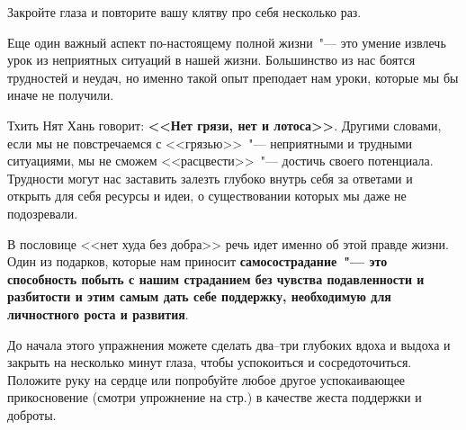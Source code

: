 \begin{center}
	{\large Закройте глаза и повторите вашу клятву про себя несколько раз.}
\end{center}

\vspace{3ex}


\newpage
{} \label{Ex:Silver_Linings}

Еще один важный аспект по-настоящему полной жизни~"--- это умение извлечь урок из неприятных ситуаций в нашей жизни. Большинство из нас боятся трудностей и неудач, но именно такой опыт преподает нам уроки, которые мы бы иначе не получили.

Тхить Нят Хань говорит: \textbf{<<Нет грязи, нет и лотоса>>}. Другими словами, если мы не повстречаемся с <<грязью>>~"--- неприятными и трудными ситуациями, мы не сможем <<расцвести>>~"--- достичь своего потенциала. Трудности могут нас заставить залезть глубоко внутрь себя за ответами и открыть для себя ресурсы и идеи, о существовании которых мы даже не подозревали. 

В пословице <<нет худа без добра>> речь идет именно об этой правде жизни. Один из подарков, которые нам приносит \textbf{самосострадание~"--- это способность побыть с нашим страданием без чувства подавленности и разбитости и этим самым дать себе поддержку, необходимую для личностного роста и развития}. 

До начала этого упражнения можете сделать два--три глубоких вдоха и выдоха и закрыть на несколько минут глаза, чтобы успокоиться и сосредоточиться. Положите руку на сердце или попробуйте любое другое успокаивающее прикосновение (смотри упрожнение на стр.\:\pageref{IP:Soothing_Touch}) в качестве жеста поддержки и доброты. 

